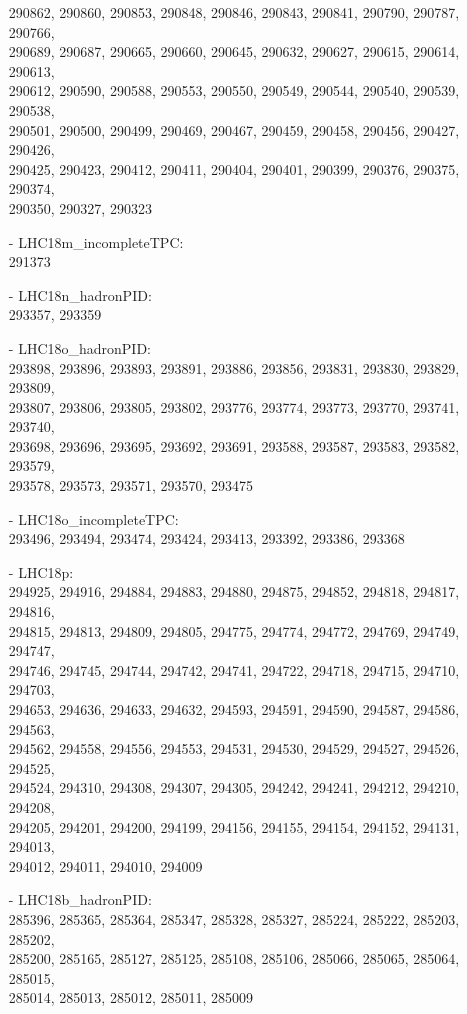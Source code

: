 \begin{appendix}
\begin{itemize}
     290862, 290860, 290853, 290848, 290846, 290843, 290841, 290790, 290787, 290766,\\
     290689, 290687, 290665, 290660, 290645, 290632, 290627, 290615, 290614, 290613,\\
     290612, 290590, 290588, 290553, 290550, 290549, 290544, 290540, 290539, 290538,\\
     290501, 290500, 290499, 290469, 290467, 290459, 290458, 290456, 290427, 290426,\\
     290425, 290423, 290412, 290411, 290404, 290401, 290399, 290376, 290375, 290374,\\
     290350, 290327, 290323
    \item[-] LHC18m\_incompleteTPC:\\[1pt]
     291373 
    \item[-] LHC18n\_hadronPID:\\[1pt]
     293357, 293359
    \item[-] LHC18o\_hadronPID:\\[1pt]
     293898, 293896, 293893, 293891, 293886, 293856, 293831, 293830, 293829, 293809,\\
     293807, 293806, 293805, 293802, 293776, 293774, 293773, 293770, 293741, 293740,\\
     293698, 293696, 293695, 293692, 293691, 293588, 293587, 293583, 293582, 293579,\\
     293578, 293573, 293571, 293570, 293475
    \item[-] LHC18o\_incompleteTPC:\\[1pt]
     293496, 293494, 293474, 293424, 293413, 293392, 293386, 293368 
    \item[-] LHC18p:\\[1pt]
     294925, 294916, 294884, 294883, 294880, 294875, 294852, 294818, 294817, 294816,\\
     294815, 294813, 294809, 294805, 294775, 294774, 294772, 294769, 294749, 294747,\\
     294746, 294745, 294744, 294742, 294741, 294722, 294718, 294715, 294710, 294703,\\
     294653, 294636, 294633, 294632, 294593, 294591, 294590, 294587, 294586, 294563,\\
     294562, 294558, 294556, 294553, 294531, 294530, 294529, 294527, 294526, 294525,\\
     294524, 294310, 294308, 294307, 294305, 294242, 294241, 294212, 294210, 294208,\\
     294205, 294201, 294200, 294199, 294156, 294155, 294154, 294152, 294131, 294013,\\
     294012, 294011, 294010, 294009
    \item[-] LHC18b\_hadronPID:\\[1pt]
     285396, 285365, 285364, 285347, 285328, 285327, 285224, 285222, 285203, 285202,\\
     285200, 285165, 285127, 285125, 285108, 285106, 285066, 285065, 285064, 285015,\\
     285014, 285013, 285012, 285011, 285009
\end{itemize}


\end{appendix}
